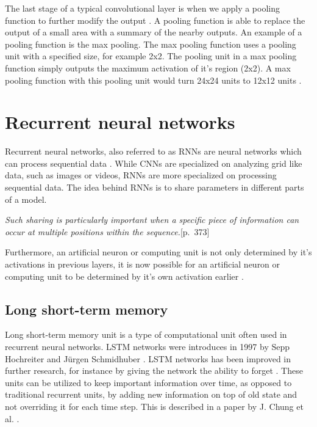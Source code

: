 The last stage of a typical convolutional layer is when we apply a pooling function to further modify the output \parencite{zhou_computation_1988}. A pooling function is able to replace the output of a small area with a summary of the nearby outputs. An example of a pooling function is the max pooling. The max pooling function uses a pooling unit with a specified size, for example 2x2. The pooling unit in a max pooling function simply outputs the maximum activation of it's region (2x2). A max pooling function with this pooling unit would turn 24x24 units to 12x12 units \cite{goodfellow_deep_2016} \cite{nielsen_neural_2015}.

\section{Recurrent neural networks}

Recurrent neural networks, also referred to as RNNs  are neural networks which can process sequential data \cite{rumelhart_learning_1986}. While CNNs are specialized on analyzing grid like data, such as images or videos, RNNs are more specialized on processing sequential data. The idea behind RNNs is to share parameters in different parts of a model. 

\begin{displayquote}
 \textit{Such sharing is particularly important when a specific piece of information can occur at multiple positions within the sequence.}{\cite{goodfellow_deep_2016}[p.~373]}
\end{displayquote}

Furthermore, an artificial neuron or computing unit is not only determined by it's activations in previous layers, it is now possible for an artificial neuron or computing unit to be determined by it's own activation earlier \cite{goodfellow_deep_2016} \cite{nielsen_neural_2015}.

\subsection{Long short-term memory}
\label{theory-LSTM}

Long short-term memory unit is a type of computational unit often used in recurrent neural networks. LSTM networks were introduces in 1997 by Sepp Hochreiter and Jürgen Schmidhuber \cite{hochreiter_long_1997}. LSTM networks has been improved in further research, for instance by giving the network the ability to forget \cite{gers_learning_1999}. These units can be utilized to keep important information over time, as opposed to traditional recurrent units, by adding new information on top of old state and not overriding it for each time step. This is described in a paper by J. Chung et al. \cite{chung_empirical_2014}.

